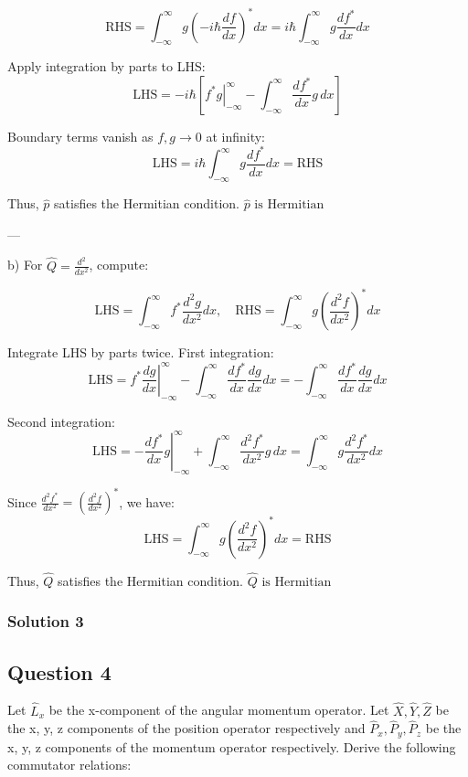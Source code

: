 \documentclass{article}
\begin{document}
\[
\text{RHS} = \int_{-\infty}^{\infty} g \left(-i\hbar \frac{df}{dx}\right)^* dx = i\hbar \int_{-\infty}^{\infty} g \frac{df^*}{dx} dx
\]

Apply integration by parts to LHS:
\[
\text{LHS} = -i\hbar \left[ \left. f^* g \right|_{-\infty}^\infty - \int_{-\infty}^{\infty} \frac{df^*}{dx} g \, dx \right]
\]

Boundary terms vanish as \(f, g \to 0\) at infinity:
\[
\text{LHS} = i\hbar \int_{-\infty}^{\infty} g \frac{df^*}{dx} dx = \text{RHS}
\]

Thus, \(\hat{p}\) satisfies the Hermitian condition. \(\boxed{\hat{p} \text{ is Hermitian}}\)

---

b) For \(\hat{Q} = \frac{d^2}{dx^2}\), compute:

\[
\text{LHS} = \int_{-\infty}^{\infty} f^* \frac{d^2g}{dx^2} dx, \quad \text{RHS} = \int_{-\infty}^{\infty} g \left(\frac{d^2f}{dx^2}\right)^* dx
\]

Integrate LHS by parts twice. First integration:
\[
\text{LHS} = \left. f^* \frac{dg}{dx} \right|_{-\infty}^\infty - \int_{-\infty}^{\infty} \frac{df^*}{dx} \frac{dg}{dx} dx = -\int_{-\infty}^{\infty} \frac{df^*}{dx} \frac{dg}{dx} dx
\]

Second integration:
\[
\text{LHS} = -\left. \frac{df^*}{dx} g \right|_{-\infty}^\infty + \int_{-\infty}^{\infty} \frac{d^2f^*}{dx^2} g \, dx = \int_{-\infty}^{\infty} g \frac{d^2f^*}{dx^2} dx
\]

Since \(\frac{d^2f^*}{dx^2} = \left(\frac{d^2f}{dx^2}\right)^*\), we have:
\[
\text{LHS} = \int_{-\infty}^{\infty} g \left(\frac{d^2f}{dx^2}\right)^* dx = \text{RHS}
\]

Thus, \(\hat{Q}\) satisfies the Hermitian condition. \(\boxed{\hat{Q} \text{ is Hermitian}}\)

\subsubsection{Solution 3}

\subsection{Question 4}

Let $\hat{L}_x$ be the x-component of the angular momentum operator. Let $\hat{X}, \hat{Y}, \hat{Z}$ be the x, y, z components of the position operator respectively and $\hat{P}_x, \hat{P}_y, \hat{P}_z$ be the x, y, z components of the momentum operator respectively. Derive the following commutator relations:   \\
\end{document}
